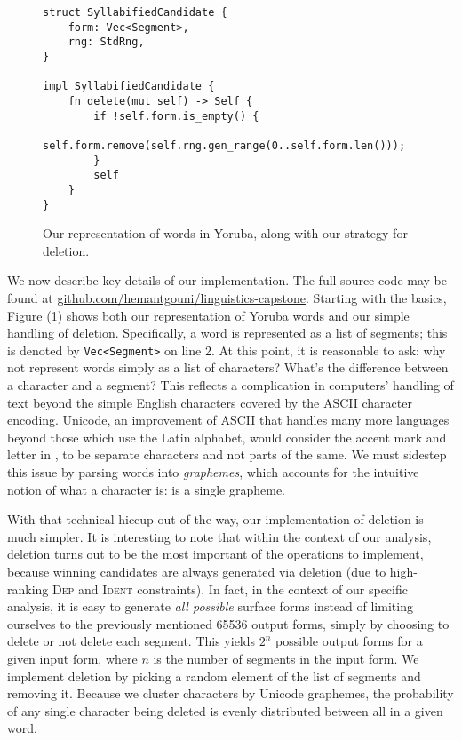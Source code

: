 \documentclass[12pt]{article}
\newcommand{\ident}{\textsc{Ident}}
\newcommand{\dep}{\textsc{Dep}}
\newcommand{\pref}[1]{(\ref{#1})}
\begin{document}
\begin{figure}[h]
\caption{Our representation of words in Yoruba, along with our strategy for deletion.}
\label{fig:impl-deletion}
\begin{verbatim}
struct SyllabifiedCandidate {
    form: Vec<Segment>,
    rng: StdRng,
}

impl SyllabifiedCandidate {
    fn delete(mut self) -> Self {
        if !self.form.is_empty() {
            self.form.remove(self.rng.gen_range(0..self.form.len()));
        }
        self
    }
}
\end{verbatim}
\end{figure}

We now describe key details of our implementation. The full source code may be
found at \href{https://github.com/hemantgouni/linguistics-capstone}{github.com/hemantgouni/linguistics-capstone}.
Starting with the basics, Figure \pref{fig:impl-deletion} shows both our
representation of Yoruba words and our simple handling of deletion.
Specifically, a word is represented as a list of segments; this is denoted by
\texttt{Vec<Segment>} on line 2.
At this point, it is reasonable to ask: why not represent words simply
as a list of characters? What's the difference between a character and a segment?
This reflects a complication in computers' handling of text beyond the
simple English characters covered by the ASCII character encoding. Unicode, an
improvement of ASCII that handles many more languages beyond those which use the
Latin alphabet, would consider the accent mark and letter  in ,
to be separate characters and not parts of the same. We must sidestep this issue by
parsing words into \textit{graphemes}, which accounts for the intuitive notion
of what a character is:  is a single grapheme.

With that technical hiccup out of the way, our implementation of deletion is much
simpler. It is interesting to note that within the context of our analysis,
deletion turns out to be the most important of the operations to implement, because
winning candidates are always generated via deletion (due to high-ranking \dep{}
and \ident{} constraints). In fact, in the context of our specific analysis, it is
easy to generate \textit{all possible} surface forms instead of limiting ourselves to
the previously mentioned 65536 output forms, simply by choosing to delete or not
delete each segment. This yields $2^n$ possible output forms for a given input
form, where $n$ is the number of segments in the input form. We implement deletion
by picking a random element of the list of segments and removing it. Because we
cluster characters by Unicode graphemes, the probability of any single character
being deleted is evenly distributed between all in a given word.
\end{document}
